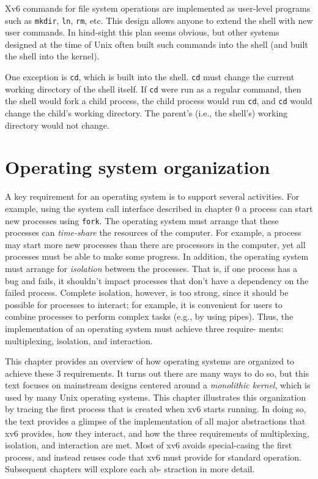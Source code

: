\documentclass{report}
\begin{document}
	Xv6 commands for file system operations are implemented as user-level programs
	such as \texttt{mkdir}, \texttt{ln}, \texttt{rm}, etc. This design allows anyone to 
	extend the shell with new user
	commands. In hind-sight this plan seems obvious, but other systems designed at the
	time of Unix often built such commands into the shell (and built the shell into the
	kernel).
	
	One exception is \texttt{cd}, which is built into the shell. \texttt{cd} must change the 
	current working directory of the shell itself. If \texttt{cd} were run as a regular command, then
	the shell would fork a child process, the child process would run \texttt{cd}, and \texttt{cd} would
	change the child's working directory. The parent's (i.e., the shell's) working directory
	would not change.
	
	\chapter{Operating system organization}
	A key requirement for an operating system is to support several activities. For
	example, using the system call interface described in chapter 0 a process can start new
	processes using \texttt{fork}. The operating system must arrange that these processes can
	\emph{time-share} the resources of the computer. For example, a process may start more
	new processes than there are processors in the computer, yet all processes must be able
	to make some progress. In addition, the operating system must arrange for \emph{isolation}
	between the processes. That is, if one process has a bug and fails, it shouldn't impact
	processes that don't have a dependency on the failed process. Complete isolation,
	however, is too strong, since it should be possible for processes to interact; for example,
	it is convenient for users to combine processes to perform complex tasks (e.g., by using
	pipes). Thus, the implementation of an operating system must achieve three require-
	ments: multiplexing, isolation, and interaction.
	
	This chapter provides an overview of how operating systems are organized to
	achieve these 3 requirements. It turns out there are many ways to do so, but this text
	focuses on mainstream designs centered around a \emph{monolithic kernel}, which is used
	by many Unix operating systems. This chapter illustrates this organization by tracing
	the first process that is created when xv6 starts running. In doing so, the text provides
	a glimpse of the implementation of all major abstractions that xv6 provides, how they
	interact, and how the three requirements of multiplexing, isolation, and interaction are
	met. Most of xv6 avoids special-casing the first process, and instead reuses code that
	xv6 must provide for standard operation. Subsequent chapters will explore each ab-
	straction in more detail.
	
\end{document}
